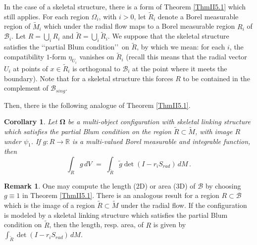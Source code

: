 \documentclass[10pt]{amsart}
\newtheorem{Corollary}[Thm]{Corollary}
\theoremstyle{definition}
\theoremstyle{definition}
\newtheorem{Remark}[Thm]{Remark}
\numberwithin{equation}{section}
\newcommand{\R}{{\mathbb R}}
\def \bgW {\boldsymbol \Omega}
\def \cB {\mathcal{B}}
\def \gW {\Omega}
\begin{document}
\par 
In the case of a skeletal structure, there is a form of Theorem 
\ref{ThmII5.1} which still applies.  For each region $\gW_i$, with $i > 0$, 
let $\tilde R_i$ denote a Borel measurable region of $\tilde M_i$ which 
under the radial flow maps to a Borel measurable region $ R_i$ of $\cB_i$.  
Let $R = \displaystyle \bigcup_{i} R_i$ and $\tilde R = \displaystyle 
\bigcup_{i} \tilde R_i$.  We suppose 
that the skeletal structure satisfies the \lq\lq partial Blum 
condition\rq\rq\, on $\tilde R$, by which we mean: for each $i$, the 
compatibility $1$-form $\eta_{U_i}$ vanishes on $\tilde R_i$ (recall this 
means that the radial vector $U_i$ at points of $x \in \tilde R_i$ is 
orthogonal to $\cB_i$ at the point where it meets the boundary).  Note 
that for a skeletal structure this forces $R$ to be contained in the 
complement of $\cB_{sing}$.  \par 
Then, there is the following analogue of Theorem \ref{ThmII5.1}.
\begin{Corollary}
\label{CorII5.1}
Let $\bgW$ be a multi-object configuration with skeletal linking 
structure which satisfies the partial Blum condition on the region $\tilde 
R \subset \tilde M$, with image $R$ under $\psi_1$.  If $g : R \to \R$ is a 
multi-valued Borel measurable and integrable function, then
\begin{equation}
\label{EqnII5.3b}
\int_{ R} g\, dV \,\, = \,\, \int_{\tilde R} \tilde g \det(I - r_i S_{rad})\, 
dM\, .
\end{equation} 
\end{Corollary}

\begin{Remark} \label{RemII5.5}
\normalfont
One may compute the length (2D) or area (3D) of $\cB$
by choosing $g \equiv 1$ in Theorem \ref{ThmII5.1}. 
There is an analogous result for a region $R \subset \cB$ which is the 
image of a region $\tilde R \subset \tilde M$ under the radial flow.  If the 
configuration is modeled by a skeletal linking structure which satisfies 
the partial Blum condition on $\tilde R$, then the length, resp. area, of 
$R$ is given by $\int_{\tilde R} \det(I - r_i S_{rad})\, dM$. 
\end{Remark}

\par 
\end{document}
